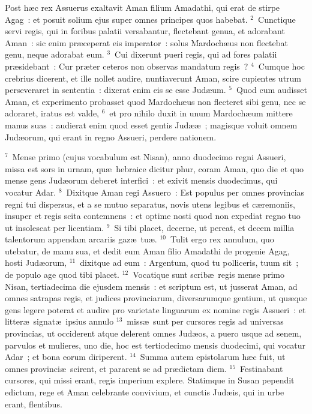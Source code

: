 \lettrine[lines=10,image=true,loversize=0.05,lraise=-0.03]{P}{}ost h\ae c rex Assuerus exaltavit Aman filium Amadathi, qui erat de stirpe Agag~: et posuit solium ejus super omnes principes quos habebat.
${}^{2}$~Cunctique servi regis, qui in foribus palatii versabantur, flectebant genua, et adorabant Aman~: sic enim pr\ae ceperat eis imperator~: solus Mardoch\ae us non flectebat genu, neque adorabat eum.
${}^{3}$~Cui dixerunt pueri regis, qui ad fores palatii pr\ae sidebant~: Cur pr\ae ter ceteros non observas mandatum regis~?
${}^{4}$~Cumque hoc crebrius dicerent, et ille nollet audire, nuntiaverunt Aman, scire cupientes utrum perseveraret in sententia~: dixerat enim eis se esse Jud\ae um.
${}^{5}$~Quod cum audisset Aman, et experimento probasset quod Mardoch\ae us non flecteret sibi genu, nec se adoraret, iratus est valde,
${}^{6}$~et pro nihilo duxit in unum Mardoch\ae um mittere manus suas~: audierat enim quod esset gentis Jud\ae \ae~; magisque voluit omnem Jud\ae orum, qui erant in regno Assueri, perdere nationem.


${}^{7}$~Mense primo (cujus vocabulum est Nisan), anno duodecimo regni Assueri, missa est sors in urnam, qu\ae\ hebraice dicitur phur, coram Aman, quo die et quo mense gens Jud\ae orum deberet interfici~: et exivit mensis duodecimus, qui vocatur Adar.
${}^{8}$~Dixitque Aman regi Assuero~: Est populus per omnes provincias regni tui dispersus, et a se mutuo separatus, novis utens legibus et c\ae remoniis, insuper et regis scita contemnens~: et optime nosti quod non expediat regno tuo ut insolescat per licentiam.
${}^{9}$~Si tibi placet, decerne, ut pereat, et decem millia talentorum appendam arcariis gaz\ae\ tu\ae .
${}^{10}$~Tulit ergo rex annulum, quo utebatur, de manu sua, et dedit eum Aman filio Amadathi de progenie Agag, hosti Jud\ae orum,
${}^{11}$~dixitque ad eum~: Argentum, quod tu polliceris, tuum sit~; de populo age quod tibi placet.
${}^{12}$~Vocatique sunt scrib\ae\ regis mense primo Nisan, tertiadecima die ejusdem mensis~: et scriptum est, ut jusserat Aman, ad omnes satrapas regis, et judices provinciarum, diversarumque gentium, ut qu\ae que gens legere poterat et audire pro varietate linguarum ex nomine regis Assueri~: et litter\ae\ signat\ae\ ipsius annulo
${}^{13}$~miss\ae\ sunt per cursores regis ad universas provincias, ut occiderent atque delerent omnes Jud\ae os, a puero usque ad senem, parvulos et mulieres, uno die, hoc est tertiodecimo mensis duodecimi, qui vocatur Adar~; et bona eorum diriperent.
${}^{14}$~Summa autem epistolarum h\ae c fuit, ut omnes provinci\ae\ scirent, et pararent se ad pr\ae dictam diem.
${}^{15}$~Festinabant cursores, qui missi erant, regis imperium explere. Statimque in Susan pependit edictum, rege et Aman celebrante convivium, et cunctis Jud\ae is, qui in urbe erant, flentibus.

